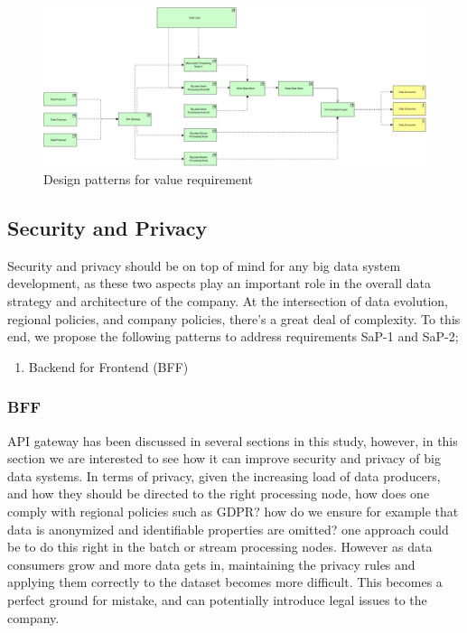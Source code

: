 \documentclass[conference]{IEEEtran}
\begin{document}
\begin{figure}[h]
    \includegraphics[width=17cm]{../Media/Value Requirement.jpg}
    \caption[]{Design patterns for value requirement }
    \label{fig:Value Requirements}
\end{figure}

\subsection{Security and Privacy}

Security and privacy should be on top of mind for any big data system development, as these two aspects play an important role in the overall data strategy and architecture of the company. At the intersection of data evolution, regional policies, and company policies, there's a great deal of complexity. To this end, we propose the following patterns to address requirements SaP-1 and SaP-2;

\begin{enumerate}
    \item Backend for Frontend (BFF)
\end{enumerate}

\subsubsection{BFF}

API gateway has been discussed in several sections in this study, however, in this section we are interested to see how it can improve security and privacy of big data systems. In terms of privacy, given the increasing load of data producers, and how they should be directed to the right processing node, how does one comply with regional policies such as GDPR? how do we ensure for example that data is anonymized and identifiable properties are omitted? one approach could be to do this right in the batch or stream processing nodes. However as data consumers grow and more data gets in, maintaining the privacy rules and applying them correctly to the dataset becomes more difficult. This becomes a perfect ground for mistake, and can potentially introduce legal issues to the company. 
\end{document}
